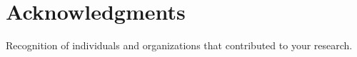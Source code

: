 \chapter{Acknowledgments}
Recognition of individuals and organizations that contributed to your research.